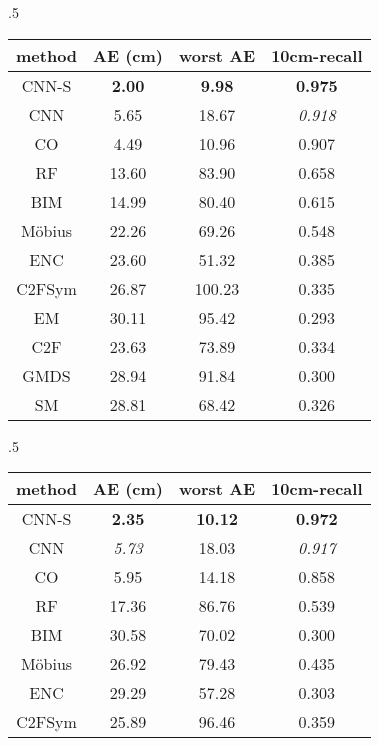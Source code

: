 \documentclass[10pt,twocolumn,letterpaper]{article}
\begin{document}
\begin{table*}[!htb]
\begin{subtable}{.5\textwidth}
\centering
\begin{tabular}{|c|c|c|c|}
\hline
method & AE (cm) & worst AE & 10cm-recall\\ \hline
CNN-S &\textbf{ 2.00 }&\textbf{ 9.98} & \textbf{0.975}\\ \hline
CNN & 5.65 & 18.67 & \textit{0.918}\\ \hline
CO\cite{chen15} & 4.49 & 10.96 & 0.907\\ \hline
RF\cite{Rodola_2014_CVPR} & 13.60 & 83.90 & 0.658\\ \hline
BIM\cite{Kim11} & 14.99 & 80.40 & 0.615\\ \hline
M\"obius\cite{Lipman:2009:MVS} & 22.26 & 69.26 & 0.548\\ \hline
ENC\cite{rodola2013elastic} & 23.60 & 51.32 & 0.385\\ \hline
C2FSym\cite{sahilliouglu2013coarse} & 26.87 & 100.23 & 0.335\\ \hline
EM\cite{sahillioglu2012minimum} & 30.11 & 95.42 & 0.293\\ \hline
C2F\cite{sahillioglu2011coarse} & 23.63 & 73.89 & 0.334\\ \hline
GMDS\cite{Bronstein:2006} & 28.94 & 91.84 & 0.300\\ \hline
SM\cite{pokrass2013sparse} & 28.81 & 68.42 & 0.326\\ \hline
\end{tabular}
\caption{Accuracy on intra-subject pairs}
\end{subtable}
\begin{subtable}{.5\textwidth}
\centering
\begin{tabular}{|c|c|c|c|}
\hline
method & AE (cm) & worst AE & 10cm-recall\\ \hline
CNN-S & \textbf{2.35} & \textbf{10.12} & \textbf{0.972}\\ \hline
CNN & \textit{5.73} & 18.03 & \textit{0.917}\\ \hline
CO\cite{chen15} & 5.95 & 14.18 & 0.858\\ \hline
RF\cite{Rodola_2014_CVPR} & 17.36 & 86.76 & 0.539\\ \hline
BIM\cite{Kim11} & 30.58 & 70.02 & 0.300\\ \hline
M\"obius\cite{Lipman:2009:MVS} & 26.92 & 79.43 & 0.435\\ \hline
ENC\cite{rodola2013elastic} & 29.29 & 57.28 & 0.303\\ \hline
C2FSym\cite{sahilliouglu2013coarse} & 25.89 & 96.46 & 0.359\\ \hline

\end{tabular}
\end{subtable}
\end{table*}
\end{document}
